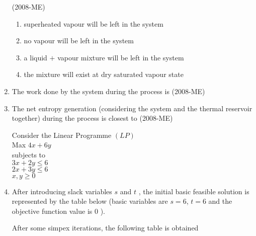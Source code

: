 \documentclass[journal]{IEEEtran}
\begin{document}
\begin{enumerate}
 \hfill(2008-ME)
 \begin{enumerate}
     \item superheated vapour will be left in the system 
     \item no vapour will be left in the system 
     \item a liquid $+$ vapour mixture will be left in the system 
     \item the mixture will exist at dry saturated vapour state 
 \end{enumerate}
 \item The work done by the system during the process is \hfill(2008-ME) 
 \begin{enumerate}
 \end{enumerate}
\item The net entropy generation (considering the system and the thermal reservoir together) during the process is closest to \label{73} \hfill(2008-ME)
\begin{enumerate}
\end{enumerate}
Consider the Linear Programme $(LP)$ \\ 
Max $4x+6y$ \\ subjects to \\ $3x+2y \leq 6$ \\ $2x+3y \leq 6$ \\
$x,y \geq 0$ \\ 
\item After introducing slack variables $s$
 and $t$
, the initial basic feasible solution is represented by the table below (basic variables are $s = 6$, $t = 6$
 and the objective function value is $0$
).
\begin{table}[H]
    \centering
 
\end{table}
After some simpex iterations, the following table is obtained  

\end{enumerate}
\end{document}
